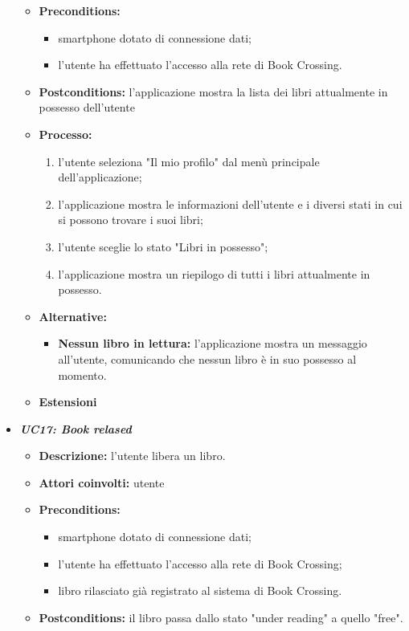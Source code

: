 \begin{itemize}
\begin{itemize}
		\item \textbf{Preconditions:}
		\begin{itemize}
			\item smartphone dotato di connessione dati;
			\item l’utente ha effettuato l’accesso alla rete di Book Crossing.
		\end{itemize}
		\item \textbf{Postconditions:} l'applicazione mostra la lista dei libri attualmente in possesso dell'utente 
		\item \textbf{Processo:}
		\begin{enumerate}
			\item l'utente seleziona "Il mio profilo" dal menù principale dell'applicazione;
			\item l'applicazione mostra le informazioni dell'utente e i diversi stati in cui si possono trovare i suoi libri;
			\item l'utente sceglie lo stato "Libri in possesso";
			\item l'applicazione mostra un riepilogo di tutti i libri attualmente in possesso.
		\end{enumerate}
		\item \textbf{Alternative:}
		\begin{itemize}
			\item \textbf{Nessun libro in lettura:} l'applicazione mostra un messaggio all'utente, comunicando che nessun libro è in suo possesso al momento.
		\end{itemize}
		\item \textbf{Estensioni}
	\end{itemize}
	\item \textbf{\textit{UC17: Book relased}}
	\begin{itemize}
		\item \textbf{Descrizione:} l'utente libera un libro.
		\item \textbf{Attori coinvolti:} utente
		\item \textbf{Preconditions:}
		\begin{itemize}
			\item smartphone dotato di connessione dati;
			\item l’utente ha effettuato l’accesso alla rete di Book Crossing;
			\item libro rilasciato già registrato al sistema di Book Crossing.
		\end{itemize}
		\item \textbf{Postconditions:} il libro passa dallo stato "under reading" a quello "free".

\end{itemize}
\end{itemize}
